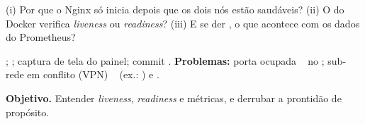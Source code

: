 \begin{checagem}
(i) Por que o Nginx só inicia depois que os dois nós estão saudáveis? (ii) O  do Docker verifica
\emph{liveness} ou \emph{readiness}? (iii) E se der , o que acontece com os dados do Prometheus?
\end{checagem}

\begin{evid}
; ; captura de tela do painel;
commit . \textbf{Problemas:} porta ocupada \seta\  no ; sub-rede
em conflito (VPN) \seta\  (ex.: ) e .
\end{evid}


\textbf{Objetivo.} Entender \emph{liveness}, \emph{readiness} e métricas, e derrubar a prontidão de propósito.

